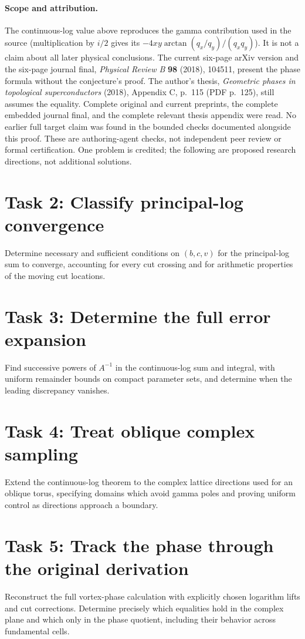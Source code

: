 \documentclass[10pt]{article}
\begin{document}
\paragraph{Scope and attribution.}
The continuous-log value above reproduces the gamma contribution
used in the source (multiplication by $i/2$ gives its
$-4xy\arctan(q_x/q_y)/(q_xq_y)$). It is not a claim about all later
physical conclusions. The current six-page arXiv version and the
six-page journal final, \emph{Physical Review B} \textbf{98} (2018),
104511, present the phase formula without the conjecture's proof.
The author's thesis, \emph{Geometric phases in topological
superconductors} (2018), Appendix C, p.~115 (PDF p.~125), still
assumes the equality. Complete original and current preprints,
the complete embedded journal final, and the complete relevant
thesis appendix were read. No earlier full target claim was found
in the bounded checks documented alongside this proof. These are
authoring-agent checks, not independent peer review or formal
certification. One problem is credited; the following are proposed
research directions, not additional solutions.

\section*{Task 2: Classify principal-log convergence}
Determine necessary and sufficient conditions on $(b,c,v)$ for
the principal-log sum to converge, accounting for every cut
crossing and for arithmetic properties of the moving cut locations.

\section*{Task 3: Determine the full error expansion}
Find successive powers of $A^{-1}$ in the continuous-log sum and
integral, with uniform remainder bounds on compact parameter sets,
and determine when the leading discrepancy vanishes.

\section*{Task 4: Treat oblique complex sampling}
Extend the continuous-log theorem to the complex lattice directions
used for an oblique torus, specifying domains which avoid gamma
poles and proving uniform control as directions approach a boundary.

\section*{Task 5: Track the phase through the original derivation}
Reconstruct the full vortex-phase calculation with explicitly
chosen logarithm lifts and cut corrections. Determine precisely
which equalities hold in the complex plane and which only in the
phase quotient, including their behavior across fundamental cells.
\end{document}

